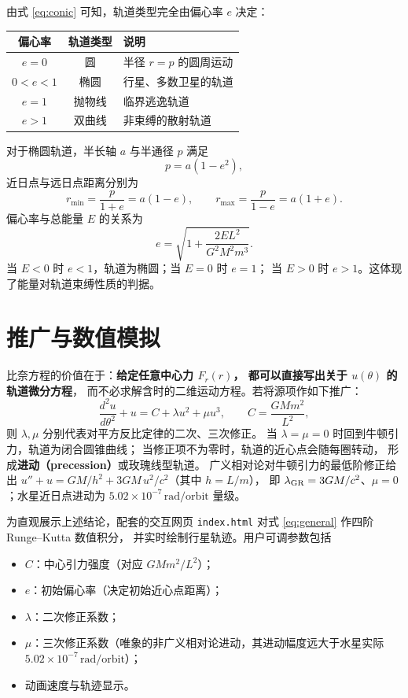 \documentclass[UTF8,a4paper,11pt]{ctexart}
\begin{document}
由式 \eqref{eq:conic} 可知，轨道类型完全由偏心率 \(e\) 决定：
\begin{center}
\begin{tabular}{ccl}
\toprule
偏心率 & 轨道类型 & 说明 \\
\midrule
\(e=0\) & 圆 & 半径 \(r=p\) 的圆周运动 \\
\(0<e<1\) & 椭圆 & 行星、多数卫星的轨道 \\
\(e=1\) & 抛物线 & 临界逃逸轨道 \\
\(e>1\) & 双曲线 & 非束缚的散射轨道 \\
\bottomrule
\end{tabular}
\end{center}
对于椭圆轨道，半长轴 \(a\) 与半通径 \(p\) 满足
\begin{equation}
  p = a\left(1-e^{2}\right),
\end{equation}
近日点与远日点距离分别为
\begin{equation}
  r_{\min}=\frac{p}{1+e}=a(1-e),
  \qquad
  r_{\max}=\frac{p}{1-e}=a(1+e).
\end{equation}
偏心率与总能量 \(E\) 的关系为
\begin{equation}
  e = \sqrt{1+\frac{2E L^{2}}{G^{2}M^{2}m^{3}}} .
\end{equation}
当 \(E<0\) 时 \(e<1\)，轨道为椭圆；当 \(E=0\) 时 \(e=1\)；
当 \(E>0\) 时 \(e>1\)。这体现了能量对轨道束缚性质的判据。

\section{推广与数值模拟}

比奈方程的价值在于：\textbf{给定任意中心力 \(F_r(r)\)，
都可以直接写出关于 \(u(\theta)\) 的轨道微分方程}，
而不必求解含时的二维运动方程。若将源项作如下推广：
\begin{equation}
  \frac{d^{2}u}{d\theta^{2}} + u
  = C + \lambda u^{2} + \mu u^{3},
  \qquad C=\frac{GMm^{2}}{L^{2}},
  \label{eq:general}
\end{equation}
则 \(\lambda,\mu\) 分别代表对平方反比定律的二次、三次修正。
当 \(\lambda=\mu=0\) 时回到牛顿引力，轨道为闭合圆锥曲线；
当修正项不为零时，轨道的近心点会随每圈转动，
形成\textbf{进动（precession）}或玫瑰线型轨道。
广义相对论对牛顿引力的最低阶修正给出
\(u''+u=GM/h^{2}+3GM\,u^{2}/c^{2}\)（其中 \(h=L/m\)），
即 \(\lambda_{\rm GR}=3GM/c^{2}\)、\(\mu=0\)；水星近日点进动为
\(5.02\times10^{-7}\,\mathrm{rad/orbit}\) 量级。

为直观展示上述结论，配套的交互网页 \texttt{index.html}
对式 \eqref{eq:general} 作四阶 Runge--Kutta 数值积分，
并实时绘制行星轨迹。用户可调参数包括
\begin{itemize}
  \item \(C\)：中心引力强度（对应 \(GMm^{2}/L^{2}\)）；
  \item \(e\)：初始偏心率（决定初始近心点距离）；
  \item \(\lambda\)：二次修正系数；
  \item \(\mu\)：三次修正系数（唯象的非广义相对论进动，其进动幅度远大于水星实际 \(5.02\times10^{-7}\,\mathrm{rad/orbit}\)）；
  \item 动画速度与轨迹显示。
\end{itemize}
\end{document}
